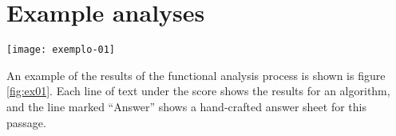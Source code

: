
\section{Example analyses}
\label{sec:example-analyses}

\begin{figure*}[t]
  \centering
  \texttt{[image: exemplo-01]}
  \caption{An excerpt of the analysis of Bach chorale \#20.}
  \label{fig:ex01}
\end{figure*}

An example of the results of the functional analysis process is shown
is figure \ref{fig:ex01}. Each line of text under the score shows the
results for an algorithm, and the line marked ``Answer'' shows a
hand-crafted answer sheet for this passage.

